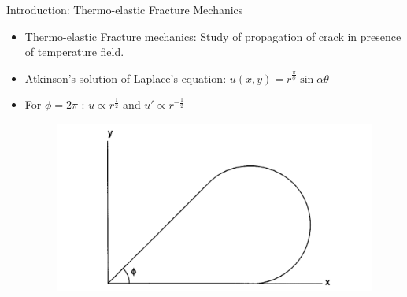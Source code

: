\documentclass{beamer}
\begin{document}
\begin{frame}[t,fragile]{Introduction: Thermo-elastic Fracture Mechanics}
    \vspace{-.3cm}
    \scriptsize
    \begin{itemize}
        \item Thermo-elastic Fracture mechanics: Study of propagation of crack in presence of temperature field.
      \item Atkinson's solution of Laplace's equation: $u(x,y)= r^{\frac{\pi}{\phi}}\sin\alpha\theta$\\
    \item For $\phi=2\pi$ :  $u \propto r^{\frac{1}{2}}$ and $u'\propto  r^{-\frac{1}{2}}$  
       \begin{figure}
    \centering
    \vspace{-40pt}
    \hspace{7.5cm}\includegraphics[width=.2\textwidth]{pie.png}
\end{figure}


\end{itemize}
\end{frame}
\end{document}
